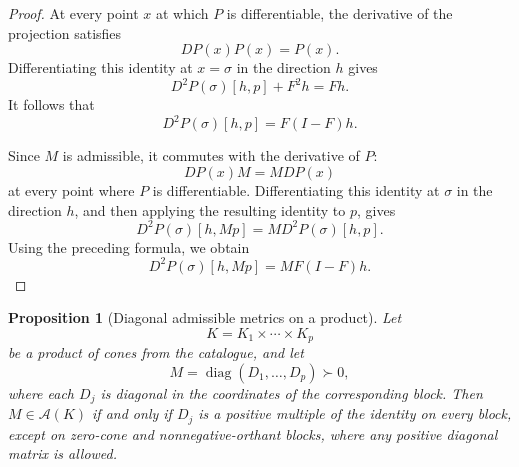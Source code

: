 \documentclass[a4paper,11pt]{book}
\theoremstyle{plain}
\newtheorem{proposition}[theorem]{Proposition}
\theoremstyle{definition}
\theoremstyle{remark}
\numberwithin{equation}{chapter}
\numberwithin{algorithm}{chapter}
\newcommand{\diag}{\operatorname{diag}}
\begin{document}
	\begin{proof}
		At every point \(x\) at which \(P\) is differentiable, the derivative of
		the projection satisfies
		\begin{equation}
			DP(x)P(x)=P(x).
		\end{equation}
		Differentiating this identity at \(x=\sigma\) in the direction \(h\) gives
		\[
		D^2P(\sigma)[h,p]+F^2h=Fh.
		\]
		It follows that
		\begin{equation}
			D^2P(\sigma)[h,p]
			=
			F(I-F)h.
		\end{equation}
		
		Since \(M\) is admissible, it commutes with the derivative of \(P\):
		\[
		DP(x)M=MDP(x)
		\]
		at every point where \(P\) is differentiable. Differentiating this identity
		at \(\sigma\) in the direction \(h\), and then applying the resulting
		identity to \(p\), gives
		\[
		D^2P(\sigma)[h,Mp]
		=
		M D^2P(\sigma)[h,p].
		\]
		Using the preceding formula, we obtain
		\[
		D^2P(\sigma)[h,Mp]
		=
		MF(I-F)h.
		\]
	\end{proof}
	
	
	
	
	\begin{proposition}[Diagonal admissible metrics on a product]
		Let
		\[
		K=K_1\times\cdots\times K_p
		\]
		be a product of cones from the catalogue, and let
		\[
		M=\diag(D_1,\ldots,D_p)\succ0,
		\]
		where each \(D_j\) is diagonal in the coordinates of the corresponding
		block. Then \(M\in\mathcal A(K)\) if and only if \(D_j\) is a positive
		multiple of the identity on every block, except on zero-cone and
		nonnegative-orthant blocks, where any positive diagonal matrix is allowed.
	\end{proposition}
	
\end{document}
